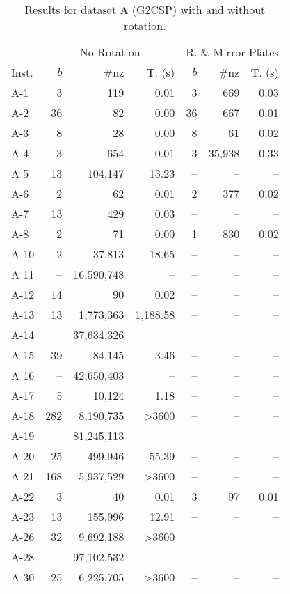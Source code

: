\begin{table}[!htpb]
\centering
\caption{Results for dataset A (G2CSP) with and without rotation.}
\label{tab:g2csp_A_joined}
\begin{tabular}{lrrrrrr}
\hline\hline
& \multicolumn{3}{c}{No Rotation} & \multicolumn{3}{c}{R. \& Mirror Plates} \\\cmidrule(lr){2-4}\cmidrule(lr){5-7}
Inst. & \(b\) & \#nz & T. (s) & \(b\) & \#nz & T. (s) \\\hline
A-1 & 3 & 119 & 0.01 & 3 & 669 & 0.03 \\
A-2 & 36 & 82 & 0.00 & 36 & 667 & 0.01 \\
A-3 & 8 & 28 & 0.00 & 8 & 61 & 0.02 \\
A-4 & 3 & 654 & 0.01 & 3 & 35,938 & 0.33 \\
A-5 & 13 & 104,147 & 13.23 & -- & -- & -- \\
A-6 & 2 & 62 & 0.01 & 2 & 377 & 0.02 \\
A-7 & 13 & 429 & 0.03 & -- & -- & -- \\
A-8 & 2 & 71 & 0.00 & 1 & 830 & 0.02 \\
A-10 & 2 & 37,813 & 18.65 & -- & -- & -- \\
A-11 & -- & 16,590,748 & -- & -- & -- & -- \\
A-12 & 14 & 90 & 0.02 & -- & -- & -- \\
A-13 & 13 & 1,773,363 & 1,188.58 & -- & -- & -- \\
A-14 & -- & 37,634,326 & -- & -- & -- & -- \\
A-15 & 39 & 84,145 & 3.46 & -- & -- & -- \\
A-16 & -- & 42,650,403 & -- & -- & -- & -- \\
A-17 & 5 & 10,124 & 1.18 & -- & -- & -- \\
A-18 & 282 & 8,190,735 & >3600 & -- & -- & -- \\
A-19 & -- & 81,245,113 & -- & -- & -- & -- \\
A-20 & 25 & 499,946 & 55.39 & -- & -- & -- \\
A-21 & 168 & 5,937,529 & >3600 & -- & -- & -- \\
A-22 & 3 & 40 & 0.01 & 3 & 97 & 0.01 \\
A-23 & 13 & 155,996 & 12.91 & -- & -- & -- \\
A-26 & 32 & 9,692,188 & >3600 & -- & -- & -- \\
A-28 & -- & 97,102,532 & -- & -- & -- & -- \\
A-30 & 25 & 6,225,705 & >3600 & -- & -- & -- \\

\end{tabular}
\end{table}
